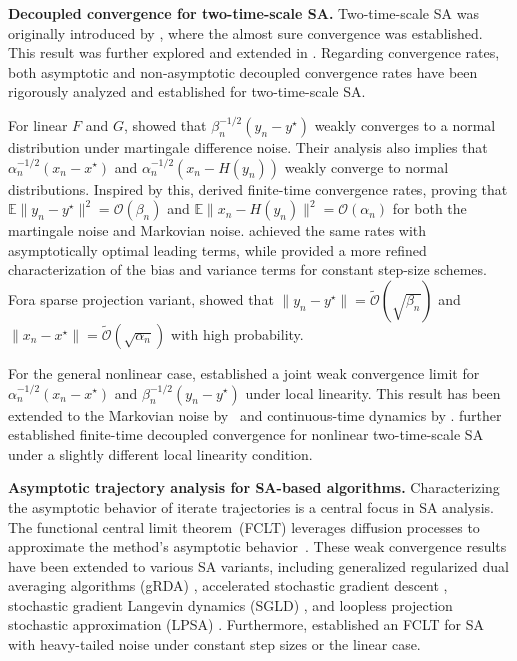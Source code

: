 \documentclass[11pt]{article}
\theoremstyle{plain}
\theoremstyle{definition}
\def\OM{{\mathcal O}}
\def\EB{{\mathbb E}}
\begin{document}
\textbf{Decoupled convergence for two-time-scale SA.}
Two-time-scale SA was originally introduced by \cite{borkar1997stochastic}, where the almost sure convergence was established. This result was further explored and extended in \cite{tadic2004almost, karmakar2018two, yaji2020stochastic}.
Regarding convergence rates, both asymptotic and non-asymptotic decoupled convergence rates have been rigorously analyzed and established for two-time-scale SA.


For linear $F$ and $G$, \citep{konda2004convergence} showed that $\beta_n^{-1/2} (y_n - y^\star)$ weakly converges to a normal distribution under martingale difference noise. Their analysis also implies that $\alpha_n^{-1/2} (x_n - x^\star)$ and $\alpha_n^{-1/2} (x_n - H(y_n))$ weakly converge to normal distributions. Inspired by this, \cite{kaledin2020finite} derived finite-time convergence rates, proving that $\EB \| y_n - y^\star \|^2 = \OM(\beta_n)$ and $\EB \| x_n - H(y_n) \|^2 = \OM(\alpha_n)$ for both the martingale noise and Markovian noise. \cite{haque2023tight} achieved the same rates with asymptotically optimal leading terms, while \cite{kwon2024two} provided a more refined characterization of the bias and variance terms for constant step-size schemes. Fora sparse projection variant, \cite{dalal2020tale} showed that $\| y_n - y^\star \| = \widetilde{\OM} (\sqrt{\beta_n})$ and $\| x_n - x^\star \| = \widetilde{\OM} (\sqrt{\alpha_n})$ with high probability.

For the general nonlinear case, \cite{mokkadem2006convergence} established a joint weak convergence limit for $\alpha_n^{-1/2} (x_n - x^\star)$ and $\beta_n^{-1/2} (y_n - y^\star)$ under local linearity. This result has been extended to the Markovian noise by~\cite{hu2024central} and continuous-time dynamics by \cite{sharrock2022two}. \cite{han2024finite} further established finite-time decoupled convergence for nonlinear two-time-scale SA under a slightly different local linearity condition.
\vspace{0.1cm}

\textbf{Asymptotic trajectory analysis for SA-based algorithms.}
Characterizing the asymptotic behavior of iterate trajectories is a central focus in SA analysis. The functional central limit theorem~(FCLT) leverages diffusion processes to approximate the method's asymptotic behavior~\citep{kushner2003stochastic, borkar2009stochastic, benveniste2012adaptive, borkar2021ode}. These weak convergence results have been extended to various SA variants, including generalized regularized dual averaging algorithms (gRDA) \citep{chao2019generalization}, accelerated stochastic gradient descent \citep{wang2020asymptotic}, stochastic gradient Langevin dynamics (SGLD) \citep{negrea2022statistical}, and loopless projection stochastic approximation (LPSA) \citep{liang2023asymptotic}.
Furthermore, \cite{blanchet2024limit} established an FCLT for SA with heavy-tailed noise under constant step sizes or the linear case.
\end{document}
